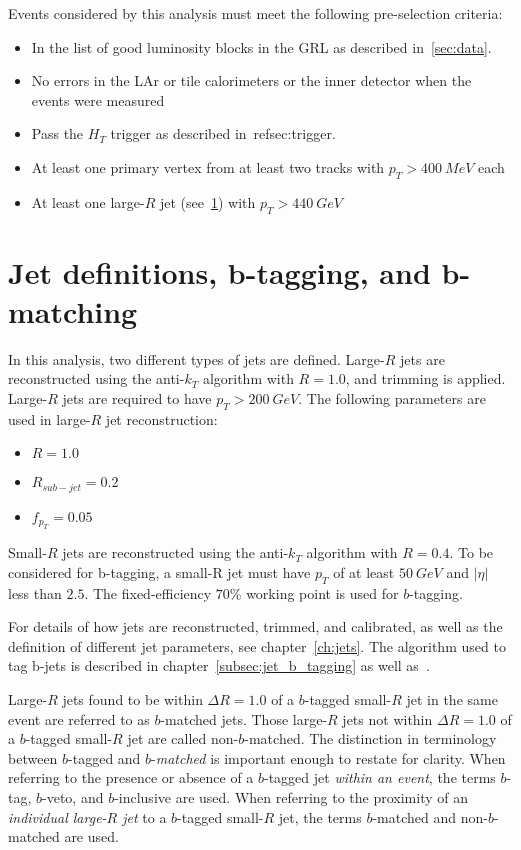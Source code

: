 Events considered by this analysis must meet the following pre-selection criteria:

\begin{itemize}
    \item In the list of good luminosity blocks in the GRL as described in~\ref{sec:data}.
    \item No errors in the LAr or tile calorimeters or the inner detector when the events were measured
    \item Pass the $H_{T}$ trigger as described in~ref{sec:trigger}.
    \item At least one primary vertex from at least two tracks with $p_{T}>400~MeV$ each
    \item At least one large-$R$ jet (see~\ref{sec:jet_definitions}) with $p_{T}>440~GeV$
\end{itemize}

\section{Jet definitions, b-tagging, and b-matching}\label{sec:jet_definitions}

In this analysis, two different types of jets are defined.
Large-$R$ jets are reconstructed using the anti-$k_{T}$ algorithm with $R=1.0$, and trimming is applied.
Large-$R$ jets are required to have $p_{T}>200~GeV$.
The following parameters are used in large-$R$ jet reconstruction:

\begin{itemize}
    \item $R=1.0$
    \item $R_{sub-jet}=0.2$
    \item $f_{p_{T}}=0.05$
\end{itemize}

Small-$R$ jets are reconstructed using the anti-$k_{T}$ algorithm with $R=0.4$.
To be considered for b-tagging, a small-R jet must have $p_{T}$ of at least $50~GeV$ and $|\eta|$ less than $2.5$.
The fixed-efficiency $70\%$ working point is used for $b$-tagging.

For details of how jets are reconstructed, trimmed, and calibrated, as well as the definition of different jet parameters, see chapter~\ref{ch:jets}.
The algorithm used to tag b-jets is described in chapter~\ref{subsec:jet_b_tagging} as well as~\cite{b-jet-perf-1,b-jet-perf-2}.

Large-$R$ jets found to be within $\Delta R=1.0$ of a $b$-tagged small-$R$ jet in the same event are referred to as $b$-matched jets.
Those large-$R$ jets not within $\Delta R=1.0$ of a $b$-tagged small-$R$ jet are called non-$b$-matched.
The distinction in terminology between $b$-tagged and $b$-\textit{matched} is important enough to restate for clarity.
When referring to the presence or absence of a $b$-tagged jet \textit{within an event}, the terms $b$-tag, $b$-veto, and $b$-inclusive are used.
When referring to the proximity of an \textit{individual large-$R$ jet} to a $b$-tagged small-$R$ jet, the terms $b$-matched and non-$b$-matched are used.

